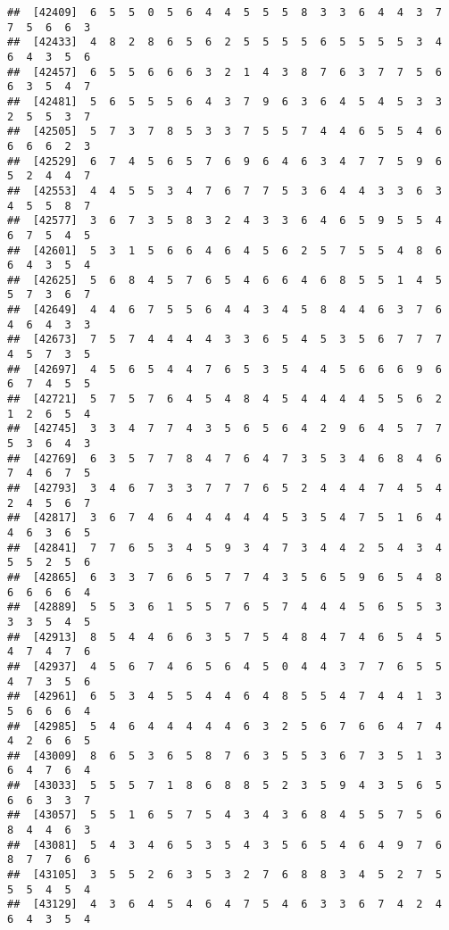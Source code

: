 \documentclass[
]{book}
\begin{document}
\begin{verbatim}
##  [42409]  6  5  5  0  5  6  4  4  5  5  5  8  3  3  6  4  4  3  7  7  5  6  6  3
##  [42433]  4  8  2  8  6  5  6  2  5  5  5  5  6  5  5  5  5  3  4  6  4  3  5  6
##  [42457]  6  5  5  6  6  6  3  2  1  4  3  8  7  6  3  7  7  5  6  6  3  5  4  7
##  [42481]  5  6  5  5  5  6  4  3  7  9  6  3  6  4  5  4  5  3  3  2  5  5  3  7
##  [42505]  5  7  3  7  8  5  3  3  7  5  5  7  4  4  6  5  5  4  6  6  6  6  2  3
##  [42529]  6  7  4  5  6  5  7  6  9  6  4  6  3  4  7  7  5  9  6  5  2  4  4  7
##  [42553]  4  4  5  5  3  4  7  6  7  7  5  3  6  4  4  3  3  6  3  4  5  5  8  7
##  [42577]  3  6  7  3  5  8  3  2  4  3  3  6  4  6  5  9  5  5  4  6  7  5  4  5
##  [42601]  5  3  1  5  6  6  4  6  4  5  6  2  5  7  5  5  4  8  6  6  4  3  5  4
##  [42625]  5  6  8  4  5  7  6  5  4  6  6  4  6  8  5  5  1  4  5  5  7  3  6  7
##  [42649]  4  4  6  7  5  5  6  4  4  3  4  5  8  4  4  6  3  7  6  4  6  4  3  3
##  [42673]  7  5  7  4  4  4  4  3  3  6  5  4  5  3  5  6  7  7  7  4  5  7  3  5
##  [42697]  4  5  6  5  4  4  7  6  5  3  5  4  4  5  6  6  6  9  6  6  7  4  5  5
##  [42721]  5  7  5  7  6  4  5  4  8  4  5  4  4  4  4  5  5  6  2  1  2  6  5  4
##  [42745]  3  3  4  7  7  4  3  5  6  5  6  4  2  9  6  4  5  7  7  5  3  6  4  3
##  [42769]  6  3  5  7  7  8  4  7  6  4  7  3  5  3  4  6  8  4  6  7  4  6  7  5
##  [42793]  3  4  6  7  3  3  7  7  7  6  5  2  4  4  4  7  4  5  4  2  4  5  6  7
##  [42817]  3  6  7  4  6  4  4  4  4  4  5  3  5  4  7  5  1  6  4  4  6  3  6  5
##  [42841]  7  7  6  5  3  4  5  9  3  4  7  3  4  4  2  5  4  3  4  5  5  2  5  6
##  [42865]  6  3  3  7  6  6  5  7  7  4  3  5  6  5  9  6  5  4  8  6  6  6  6  4
##  [42889]  5  5  3  6  1  5  5  7  6  5  7  4  4  4  5  6  5  5  3  3  3  5  4  5
##  [42913]  8  5  4  4  6  6  3  5  7  5  4  8  4  7  4  6  5  4  5  4  7  4  7  6
##  [42937]  4  5  6  7  4  6  5  6  4  5  0  4  4  3  7  7  6  5  5  4  7  3  5  6
##  [42961]  6  5  3  4  5  5  4  4  6  4  8  5  5  4  7  4  4  1  3  5  6  6  6  4
##  [42985]  5  4  6  4  4  4  4  4  6  3  2  5  6  7  6  6  4  7  4  4  2  6  6  5
##  [43009]  8  6  5  3  6  5  8  7  6  3  5  5  3  6  7  3  5  1  3  6  4  7  6  4
##  [43033]  5  5  5  7  1  8  6  8  8  5  2  3  5  9  4  3  5  6  5  6  6  3  3  7
##  [43057]  5  5  1  6  5  7  5  4  3  4  3  6  8  4  5  5  7  5  6  8  4  4  6  3
##  [43081]  5  4  3  4  6  5  3  5  4  3  5  6  5  4  6  4  9  7  6  8  7  7  6  6
##  [43105]  3  5  5  2  6  3  5  3  2  7  6  8  8  3  4  5  2  7  5  5  5  4  5  4
##  [43129]  4  3  6  4  5  4  6  4  7  5  4  6  3  3  6  7  4  2  4  6  4  3  5  4

\end{verbatim}
\end{document}
